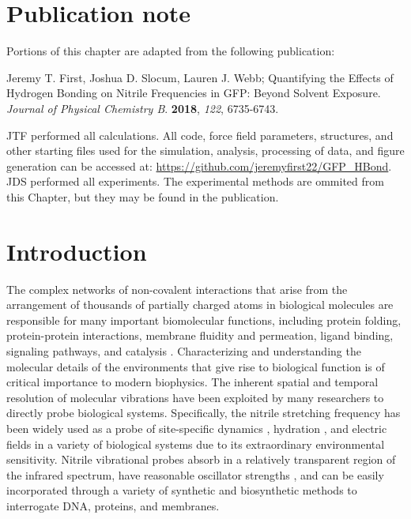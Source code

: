 \section{Publication note} \label{hbond-pub-note}

Portions of this chapter are adapted from the following publication: 

\noindent Jeremy T. First, Joshua D. Slocum, Lauren J. Webb; Quantifying the Effects of Hydrogen Bonding on Nitrile Frequencies in GFP: Beyond Solvent Exposure. \emph{Journal of Physical Chemistry B}. \textbf{2018}, \emph{122}, 6735-6743.

JTF performed all calculations.
All code, force field parameters, structures, and other starting files used for the simulation, analysis, processing of data, and figure generation can be accessed at:
\url{https://github.com/jeremyfirst22/GFP_HBond}. 
JDS performed all experiments. The experimental methods are ommited from this Chapter, but they may be found in the publication.

\section{Introduction}

The complex networks of non-covalent interactions that arise from the arrangement of thousands of partially charged atoms in biological molecules are responsible for many important biomolecular functions, including protein folding, protein-protein interactions, membrane fluidity and permeation, ligand binding, signaling pathways, and catalysis \cite{Honig1995}.
Characterizing and understanding the molecular details of the environments that give rise to biological function is of critical importance to modern biophysics.
The inherent spatial and temporal resolution of molecular vibrations have been exploited by many researchers to directly probe biological systems.
Specifically, the nitrile stretching frequency has been widely used as a probe of site-specific dynamics \cite{Fang2008, Sigala2007, Yoshikawa1985}, hydration \cite{Waegele2009, Oh2008}, and electric fields\cite{Webb2008, Slocum2016, Shrestha2015, Shrestha2017, Andrews2000, Andrews2002} in a variety of biological systems due to its extraordinary environmental sensitivity.
Nitrile vibrational probes absorb in a relatively transparent region of the infrared spectrum, have reasonable oscillator strengths \cite{Webb2008}, and can be easily incorporated through a variety of synthetic and biosynthetic methods\cite{Fafarman2006, Getahun2003, Kirshenbaum2002} to interrogate DNA, proteins, and membranes. 

